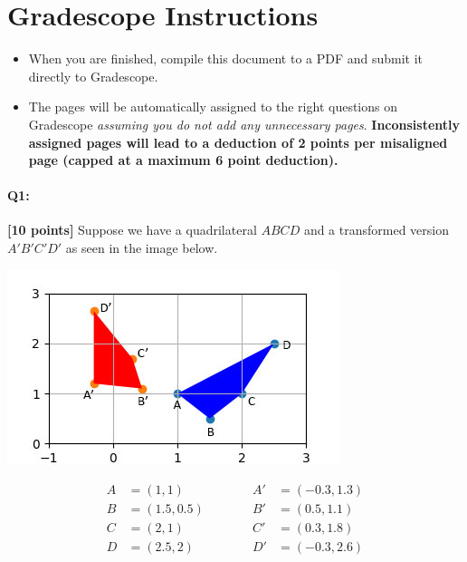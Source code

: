 \section*{ Gradescope Instructions}
\begin{itemize}
  \item When you are finished, compile this document to a PDF and submit it directly to Gradescope. 
  \item The pages will be automatically assigned to the right questions on Gradescope \textit{assuming you do not add any unnecessary pages}. \textbf{Inconsistently assigned pages will lead to a deduction of 2 points per misaligned page (capped at a maximum 6 point deduction).}
\end{itemize}
\pagebreak



\pagebreak
\paragraph{Q1:} \textbf{[10 points]}
Suppose we have a quadrilateral $ABCD$ and a transformed version $A'B'C'D'$ as seen in the image below.

\includegraphics[width=\textwidth * 5/10]{images/quadrilaterals.jpg}

\begin{equation}
\begin{split}
A&=(1, 1)\\
B&=(1.5, 0.5)\\
C&=(2, 1)\\
D&=(2.5, 2)
\end{split}
\quad\quad\quad
\begin{split}
A'&=(-0.3, 1.3)\\
B'&=(0.5, 1.1)\\
C'&=(0.3, 1.8)\\
D'&=(-0.3, 2.6)
\end{split}
\end{equation}

